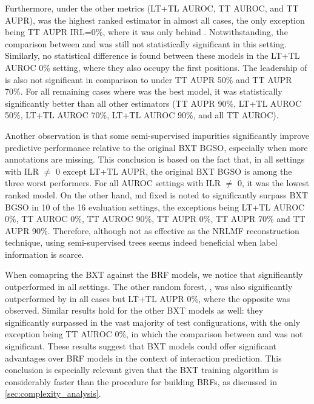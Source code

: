 Furthermore, under the other metrics (LT+TL AUROC, TT AUROC, and TT AUPR),  was the highest ranked estimator in almost all cases, the only exception being TT AUPR IRL=0\%, where it was only behind . Notwithstanding, the comparison between  and  was still not statistically significant in this setting. Similarly, no statistical difference is found between these models in the LT+TL AUROC 0\% setting, where they also occupy the first positions. The leadership of  is also not significant in comparison to  under TT AUPR 50\% and TT AUPR 70\%. For all remaining cases where  was the best model, it was statistically significantly better than all other estimators (TT AUPR 90\%, LT+TL AUROC 50\%, LT+TL AUROC 70\%, LT+TL AUROC 90\%, and all TT AUROC).


Another observation is that some semi-supervised impurities significantly improve predictive performance relative to the original BXT BGSO, especially when more annotations are missing. This conclusion is based on the fact that, in all settings with ILR $\neq$ 0 except LT+TL AUPR, the original BXT BGSO is among the three worst performers. For all AUROC settings with ILR $\neq$ 0, it was the lowest ranked model. On the other hand, md fixed is noted to significantly surpass BXT BGSO in 10 of the 16 evaluation settings, the exceptions being LT+TL AUROC 0\%, TT AUROC 0\%, TT AUROC 90\%, TT AUPR 0\%, TT AUPR 70\% and TT AUPR 90\%. Therefore, although not as effective as the NRLMF reconstruction technique, using semi-supervised trees seems indeed beneficial when label information is scarce.


When comapring the BXT against the BRF models, we notice that  significantly outperformed  in all settings. The other random forest, , was also significantly outperformed by  in all cases but LT+TL AUPR 0\%, where the opposite was observed. Similar results hold for the other BXT models as well: they significantly surpassed  in the vast majority of test configurations, with the only exception being TT AUROC 0\%, in which the comparison between  and  was not significant. These results suggest that BXT models could offer significant advantages over BRF models in the context of interaction prediction. This conclusion is especially relevant given that the BXT training algorithm is considerably faster than the procedure for building BRFs, as discussed in \autoref{sec:complexity_analysis}.

